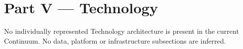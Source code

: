 \part*{Part V — Technology}
\label{navigation:V}
No individually represented Technology architecture is present in the current Continuum. No data, platform or infrastructure subsections are inferred.\par
